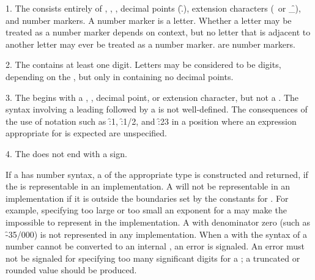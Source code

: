 \beginlist
\item{1.}
The  consists entirely of 
  ,
  ,
  ,
  decimal points (\f{.}),
  extension characters (\hat\ or \f{\_}),
  and number markers.
A number marker is a letter. 
Whether a letter may be treated as a number marker depends on context,
but no letter that is adjacent to another letter may ever be treated as a number marker.
 are number markers.

\item{2.}
The  contains at least one digit.  Letters may be considered to be
digits, depending on the , but only
in  containing no decimal points.


\item{3.}
The  begins with a , , decimal point, or extension character,
but not a 
.
The syntax involving a leading 
 followed by a  is
not well-defined. The consequences of the use 
of notation such as \f{:1}, \f{:1/2}, and \f{:2{\hat}3} in a
position where an expression appropriate for  
is expected are unspecified.

\item{4.}
The  does not end with a sign.
\endlist

If a  has number syntax, 
a  of the appropriate type is constructed and returned, 
if the  is representable in an implementation.
A  will not be representable in an implementation 
if it is outside the boundaries set by the  
constants for .
For example, specifying too large or too small an exponent for a 
may make the  impossible to represent in the implementation.
A  with denominator zero (such as \f{-35/000})
is not represented in any implementation.
When a  with the syntax of a number cannot be converted to an internal
, an error  is signaled.  An error
must not be signaled for specifying too many significant digits
for a ; a truncated or rounded value should be produced.

